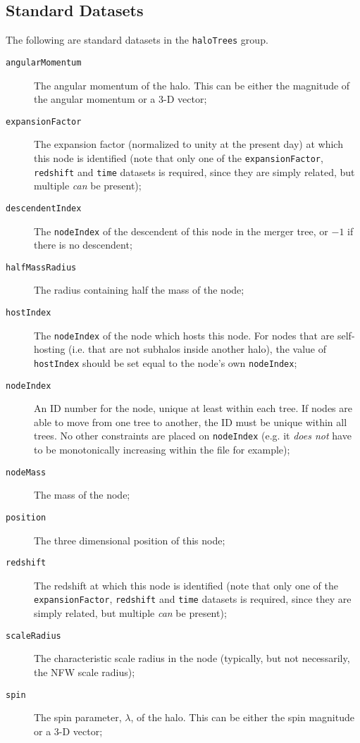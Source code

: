 \subsection{Standard Datasets}

The following are standard datasets in the {\tt haloTrees} group.

\begin{description}
 \item [{\tt angularMomentum}] The angular momentum of the halo. This can be either the magnitude of the angular momentum or a 3-D vector;
 \item [{\tt expansionFactor}] The expansion factor (normalized to unity at the present day) at which this node is identified (note that only one of the {\tt expansionFactor}, {\tt redshift} and {\tt time} datasets is required, since they are simply related, but multiple \emph{can} be present);
 \item [{\tt descendentIndex}] The {\tt nodeIndex} of the descendent of this node in the merger tree, or $-1$ if there is no descendent;
 \item [{\tt halfMassRadius}] The radius containing half the mass of the node;
 \item [{\tt hostIndex}] The {\tt nodeIndex} of the node which hosts this node. For nodes that are self-hosting (i.e. that are not subhalos inside another halo), the value of {\tt hostIndex} should be set equal to the node's own {\tt nodeIndex};
 \item [{\tt nodeIndex}] An ID number for the node, unique at least within each tree. If nodes are able to move from one tree to another, the ID must be unique within all trees. No other constraints are placed on {\tt nodeIndex} (e.g. it \emph{does not} have to be monotonically increasing within the file for example);
 \item [{\tt nodeMass}] The mass of the node;
 \item [{\tt position}] The three dimensional position of this node;
 \item [{\tt redshift}] The redshift at which this node is identified (note that only one of the {\tt expansionFactor}, {\tt redshift} and {\tt time} datasets is required, since they are simply related, but multiple \emph{can} be present);
 \item [{\tt scaleRadius}] The characteristic scale radius in the node (typically, but not necessarily, the NFW scale radius);
 \item [{\tt spin}] The spin parameter, $\lambda$, of the halo. This can be either the spin magnitude or a 3-D vector;

\end{description}

